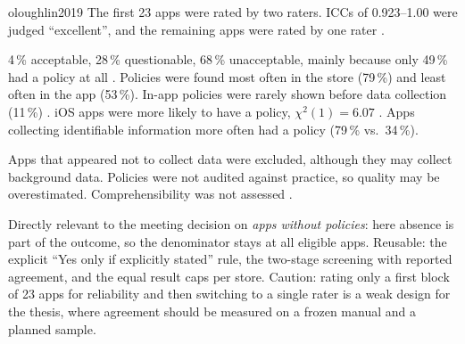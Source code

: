 \begin{papercard}{oloughlin2019}
 The first 23 apps were rated by two raters. ICCs of 0.923--1.00 were judged ``excellent'', and the remaining apps were rated by one rater .

 4\,\% acceptable, 28\,\% questionable, 68\,\% unacceptable, mainly because only 49\,\% had a policy at all . Policies were found most often in the store (79\,\%) and least often in the app (53\,\%). In-app policies were rarely shown before data collection (11\,\%) . iOS apps were more likely to have a policy, $\chi^2(1)=6.07$ . Apps collecting identifiable information more often had a policy (79\,\% vs.\ 34\,\%).

 Apps that appeared not to collect data were excluded, although they may collect background data. Policies were not audited against practice, so quality may be overestimated. Comprehensibility was not assessed .

 Directly relevant to the meeting decision on \emph{apps without policies}: here absence is part of the outcome, so the denominator stays at all eligible apps. Reusable: the explicit ``Yes only if explicitly stated'' rule, the two-stage screening with reported agreement, and the equal result caps per store. Caution: rating only a first block of 23 apps for reliability and then switching to a single rater is a weak design for the thesis, where agreement should be measured on a frozen manual and a planned sample.
\end{papercard}
